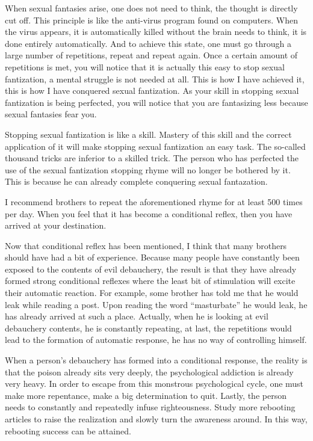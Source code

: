 \documentclass[
]{book}
\begin{document}
When sexual fantasies arise, one does not need to think, the thought is directly cut off. This principle is like the anti-virus program found on computers. When the virus appears, it is automatically killed without the brain needs to think, it is done entirely automatically. And to achieve this state, one must go through a large number of repetitions, repeat and repeat again. Once a certain amount of repetitions is met, you will notice that it is actually this easy to stop sexual fantization, a mental struggle is not needed at all. This is how I have achieved it, this is how I have conquered sexual fantization. As your skill in stopping sexual fantization is being perfected, you will notice that you are fantasizing less because sexual fantasies fear you.

Stopping sexual fantization is like a skill. Mastery of this skill and the correct application of it will make stopping sexual fantization an easy task. The so-called thousand tricks are inferior to a skilled trick. The person who has perfected the use of the sexual fantization stopping rhyme will no longer be bothered by it. This is because he can already complete conquering sexual fantazation.

I recommend brothers to repeat the aforementioned rhyme for at least 500 times per day. When you feel that it has become a conditional reflex, then you have arrived at your destination.

Now that conditional reflex has been mentioned, I think that many brothers should have had a bit of experience. Because many people have constantly been exposed to the contents of evil debauchery, the result is that they have already formed strong conditional reflexes where the least bit of stimulation will excite their automatic reaction. For example, some brother has told me that he would leak while reading a post. Upon reading the word ``masturbate'' he would leak, he has already arrived at such a place. Actually, when he is looking at evil debauchery contents, he is constantly repeating, at last, the repetitions would lead to the formation of automatic response, he has no way of controlling himself.

When a person's debauchery has formed into a conditional response, the reality is that the poison already sits very deeply, the psychological addiction is already very heavy. In order to escape from this monstrous psychological cycle, one must make more repentance, make a big determination to quit. Lastly, the person needs to constantly and repeatedly infuse righteousness. Study more rebooting articles to raise the realization and slowly turn the awareness around. In this way, rebooting success can be attained.
\end{document}
